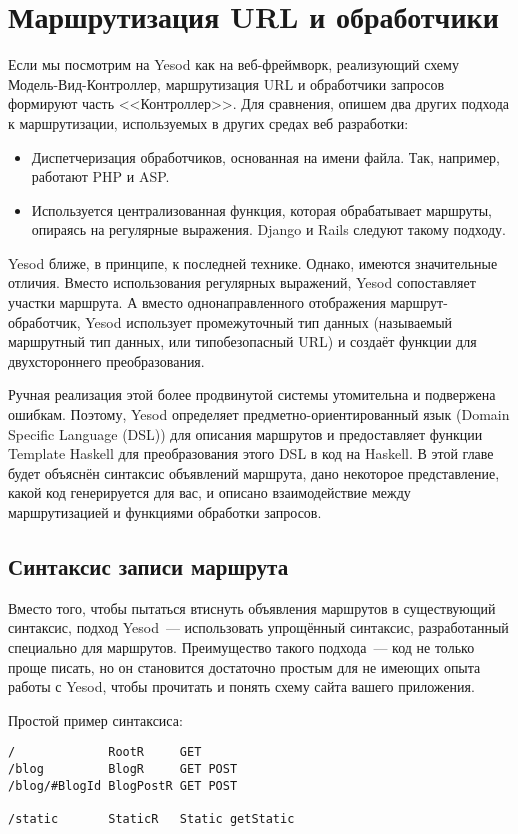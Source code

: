 \chapter{Маршрутизация URL и обработчики}
Если мы посмотрим на Yesod как на веб-фреймворк, реализующий схему
Модель-Вид-Контроллер, маршрутизация URL и обработчики запросов
формируют часть <<Контроллер>>. Для сравнения, опишем два других
подхода к маршрутизации, используемых в других средах веб разработки:
\begin{itemize}
\item Диспетчеризация обработчиков, основанная на имени файла. Так,
  например, работают PHP и ASP.

\item Используется централизованная функция, которая обрабатывает
  маршруты, опираясь на регулярные выражения. Django и Rails
  следуют такому подходу.
\end{itemize}

Yesod ближе, в принципе, к последней технике. Однако, имеются
значительные отличия. Вместо использования регулярных выражений, Yesod
сопоставляет участки маршрута. А вместо однонаправленного отображения
маршрут-обработчик, Yesod использует промежуточный тип данных
(называемый маршрутный тип данных, или типобезопасный URL) и создаёт
функции для двухстороннего преобразования.

Ручная реализация этой более продвинутой системы утомительна и
подвержена ошибкам. Поэтому, Yesod определяет предметно-ориентированный
язык (Domain Specific Language (DSL)) для описания маршрутов и
предоставляет функции Template Haskell для преобразования этого DSL в
код на Haskell. В этой главе будет объяснён синтаксис объявлений
маршрута, дано некоторое представление, какой код генерируется для
вас, и описано взаимодействие между маршрутизацией и функциями
обработки запросов.

\section{Синтаксис записи маршрута}
Вместо того, чтобы пытаться втиснуть объявления маршрутов в
существующий синтаксис, подход Yesod~--- использовать упрощённый
синтаксис, разработанный специально для маршрутов. Преимущество такого
подхода~--- код не только проще писать, но он становится достаточно
простым для не имеющих опыта работы с Yesod, чтобы прочитать и понять
схему сайта вашего приложения.

Простой пример синтаксиса:
\begin{verbatim}
/             RootR     GET
/blog         BlogR     GET POST
/blog/#BlogId BlogPostR GET POST

/static       StaticR   Static getStatic
\end{verbatim}


